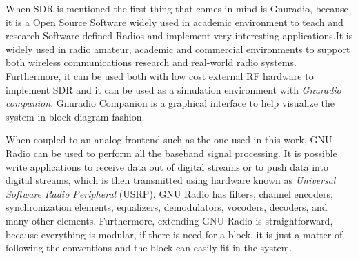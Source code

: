 When SDR is mentioned the first thing that comes in mind is Gnuradio, because it
is a Open Source Software widely used in academic environment to teach and
research Software-defined Radios and implement very interesting applications.It
is widely used in radio amateur, academic and commercial environments to support
both wireless communications research and real-world radio systems. Furthermore,
it can be used both with low cost external RF hardware to implement SDR and it
can be used as a simulation environment with \textit{Gnuradio companion}.
Gnuradio Companion is a graphical interface to help visualize the system in
block-diagram fashion.





When coupled to an analog frontend such as the one used in this work, GNU Radio
can be used to perform all the baseband signal processing. It is possible write
applications to receive data out of digital streams or to push data into digital
streams, which is then transmitted using hardware known as \textit{Universal
Software Radio Peripheral} (USRP). GNU Radio has filters, channel encoders,
synchronization elements, equalizers, demodulators, vocoders, decoders, and many
other elements. Furthermore, extending GNU Radio is straightforward, because
everything is modular, if there is need for a block, it is just a matter of
following the conventions and the block can easily fit in the system.

